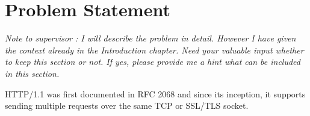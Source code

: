 \chapter{Problem Statement}
\textit{Note to supervisor : I will describe the problem in detail. However I have given the context already in the Introduction chapter. Need your valuable input whether to keep this section or not. If yes, please provide me a hint what can be included in this section. }

HTTP/1.1 was first documented in RFC 2068 \cite{b9} and since its inception, it supports sending multiple requests over the same TCP or SSL/TLS socket. 
